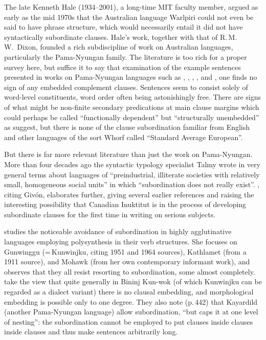 \documentclass[output=paper,colorlinks,citecolor=brown
]{langscibook}
\begin{document}
The late Kenneth Hale (1934--2001), a long-time MIT faculty member,
argued as early as the mid 1970s that the Australian language Warlpiri
could not even be said to have phrase structure, which would necessarily
entail it did not have syntactically subordinate clauses. Hale's work,
together with that of R.\,M.\,W.\ Dixon, founded a rich subdiscipline
of work on Australian languages, particularly the Pama-Nyungan family.
The literature is too rich for a proper survey here, but suffice it to
say that examination of the example sentences presented in works on
Pama-Nyungan languages such as \citet{Hale76}, \citet{Nash80},
\citet{Dixon81}, \citet{AustBres96}, and \citet{Pensalfini04},
one finds no sign of any embedded complement clauses. Sentences
seem to consist solely of word-level constituents, word order often
being astonishingly free. There are signs of what might be non-finite
secondary predications at main clause margins which could perhaps be
called ``functionally dependent'' but ``structurally unembedded'' as
\citet[228, esp.\ n.\,13]{AustBres96} suggest,
but there is none of the clause subordination familiar from English
and other languages of the sort Whorf called ``Standard Average European''.

But there is far more relevant literature than just the work on
Pama-Nyungan. More than four decades ago the syntactic typology
specialist Talmy \citet[298]{Givon79} wrote in very
general terms about languages of ``preindustrial, illiterate societies
with relatively small, homogeneous social units'' in which
``subordination does not really exist''. \citet[esp.\ pp.\,157--159]{Kalmar85}, citing Giv{\'o}n, elaborates further, giving
several earlier references and raising the interesting possibility
that Canadian Inuktitut is in the process of developing subordinate
clauses for the first time in writing on serious subjects.

\citet{Mithun84} studies the noticeable avoidance of subordination
in highly agglutinative languages employing polysynthesis in their
verb structures. She focuses on Gunwinggu (=\,Kunwinjku, citing 1951
and 1964 sources), Kathlamet (from a 1911 source), and Mohawk (from
her own contemporary informant work), and observes that they all
resist resorting to subordination, some almost completely. \citet[Section~6]{EvanLevi09} take the view that quite
generally in Bininj Kun-wok (of which Kunwinjku can be regarded as a
dialect variant) there is no clausal embedding, and morphological
embedding is possible only to one degree. They also note (p.\,442)
that Kayardild (another Pama-Nyungan language) allow subordination,
``but caps it at one level of nesting'': the subordination cannot be
employed to put clauses inside clauses inside clauses and thus make
sentences arbitrarily long.
\end{document}
